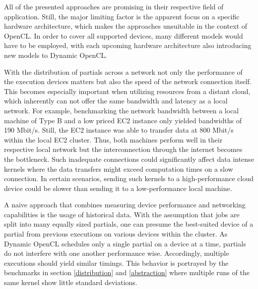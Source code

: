 All of the presented approaches are promising in their respective field of application. Still, the major limiting factor is the apparent focus on a specific hardware architecture, which makes the approaches unsuitable in the context of OpenCL. In order to cover all supported devices, many different models would have to be employed, with each upcoming hardware architecture also introducing new models to Dynamic OpenCL.

With the distribution of partials across a network not only the performance of the execution devices matters but also the speed of the network connection itself. This becomes especially important when utilizing resources from a distant cloud, which inherently can not offer the same bandwidth and latency as a local network. For example, benchmarking the network bandwidth between a local machine of Type B and a low priced EC2 instance only yielded bandwidths of 190 Mbit/s. Still, the EC2 instance was able to transfer data at 800 Mbit/s within the local EC2 cluster. Thus, both machines perform well in their respective local network but the interconnection through the internet becomes the bottleneck. Such inadequate connections could significantly affect data intense kernels where the data transfers might exceed computation times on a slow connection. In certain scenarios, sending such kernels to a high-performance cloud device could be slower than sending it to a low-performance local machine.

A naive approach that combines measuring device performance and networking capabilities is the usage of historical data. With the assumption that jobs are split into many equally sized partials, one can presume the best-suited device of a partial from previous executions on various devices within the cluster. As Dynamic OpenCL schedules only a single partial on a device at a time, partials do not interfere with one another performance wise. Accordingly, multiple executions should yield similar timings. This behavior is portrayed by the benchmarks in section \ref{distribution} and \ref{abstraction} where multiple runs of the same kernel show little standard deviations.


